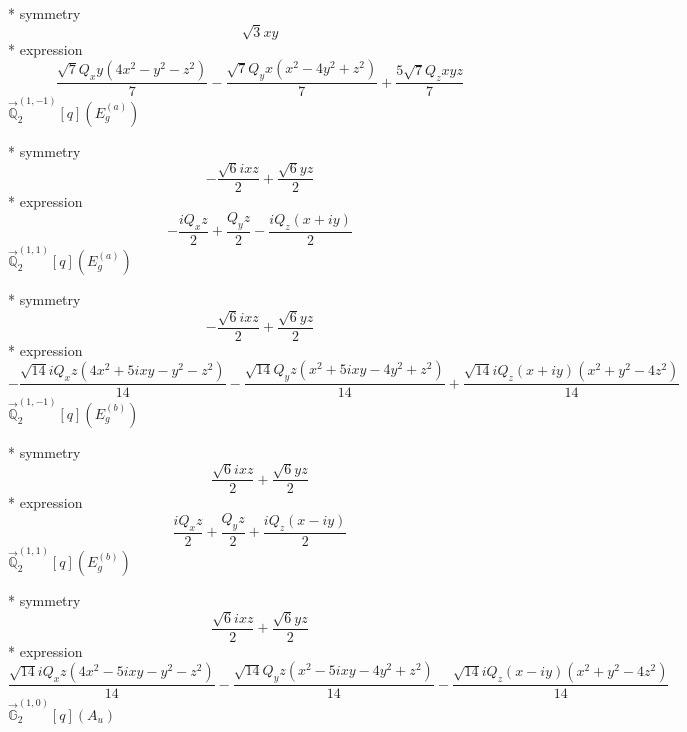 \documentclass[fleqn,8pt]{jsarticle}
\begin{document}
\noindent\quad ** symmetry
\begin{dmath*}
\sqrt{3} x y
\end{dmath*}
\noindent\quad ** expression
\begin{dmath*}
\frac{\sqrt{7} Q_{x} y \left(4 x^{2} - y^{2} - z^{2}\right)}{7} - \frac{\sqrt{7} Q_{y} x \left(x^{2} - 4 y^{2} + z^{2}\right)}{7} + \frac{5 \sqrt{7} Q_{z} x y z}{7}
\end{dmath*}
\noindent\quad $\vec{\mathbb{Q}}_{2}^{(1,-1)}[q](E_{g}^{(a)})$

\noindent\quad ** symmetry
\begin{dmath*}
- \frac{\sqrt{6} i x z}{2} + \frac{\sqrt{6} y z}{2}
\end{dmath*}
\noindent\quad ** expression
\begin{dmath*}
- \frac{i Q_{x} z}{2} + \frac{Q_{y} z}{2} - \frac{i Q_{z} \left(x + i y\right)}{2}
\end{dmath*}
\noindent\quad $\vec{\mathbb{Q}}_{2}^{(1,1)}[q](E_{g}^{(a)})$

\noindent\quad ** symmetry
\begin{dmath*}
- \frac{\sqrt{6} i x z}{2} + \frac{\sqrt{6} y z}{2}
\end{dmath*}
\noindent\quad ** expression
\begin{dmath*}
- \frac{\sqrt{14} i Q_{x} z \left(4 x^{2} + 5 i x y - y^{2} - z^{2}\right)}{14} - \frac{\sqrt{14} Q_{y} z \left(x^{2} + 5 i x y - 4 y^{2} + z^{2}\right)}{14} + \frac{\sqrt{14} i Q_{z} \left(x + i y\right) \left(x^{2} + y^{2} - 4 z^{2}\right)}{14}
\end{dmath*}
\noindent\quad $\vec{\mathbb{Q}}_{2}^{(1,-1)}[q](E_{g}^{(b)})$

\noindent\quad ** symmetry
\begin{dmath*}
\frac{\sqrt{6} i x z}{2} + \frac{\sqrt{6} y z}{2}
\end{dmath*}
\noindent\quad ** expression
\begin{dmath*}
\frac{i Q_{x} z}{2} + \frac{Q_{y} z}{2} + \frac{i Q_{z} \left(x - i y\right)}{2}
\end{dmath*}
\noindent\quad $\vec{\mathbb{Q}}_{2}^{(1,1)}[q](E_{g}^{(b)})$

\noindent\quad ** symmetry
\begin{dmath*}
\frac{\sqrt{6} i x z}{2} + \frac{\sqrt{6} y z}{2}
\end{dmath*}
\noindent\quad ** expression
\begin{dmath*}
\frac{\sqrt{14} i Q_{x} z \left(4 x^{2} - 5 i x y - y^{2} - z^{2}\right)}{14} - \frac{\sqrt{14} Q_{y} z \left(x^{2} - 5 i x y - 4 y^{2} + z^{2}\right)}{14} - \frac{\sqrt{14} i Q_{z} \left(x - i y\right) \left(x^{2} + y^{2} - 4 z^{2}\right)}{14}
\end{dmath*}
\noindent\quad $\vec{\mathbb{G}}_{2}^{(1,0)}[q](A_{u})$
\end{document}
